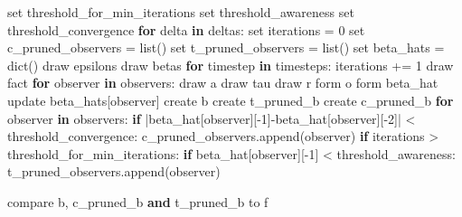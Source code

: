 \documentclass[11pt]{article}
\newenvironment{Shaded}{}{}
\newcommand{\KeywordTok}[1]{\textcolor[rgb]{0.00,0.44,0.13}{\textbf{{#1}}}}
\newcommand{\DecValTok}[1]{\textcolor[rgb]{0.25,0.63,0.44}{{#1}}}
\newcommand{\NormalTok}[1]{{#1}}
\newcommand{\ControlFlowTok}[1]{\textcolor[rgb]{0.00,0.44,0.13}{\textbf{{#1}}}}
\newcommand{\OperatorTok}[1]{\textcolor[rgb]{0.40,0.40,0.40}{{#1}}}
\newcommand{\BuiltInTok}[1]{{#1}}
\begin{document}
\begin{Shaded}
\begin{Highlighting}[]
\BuiltInTok{set}\NormalTok{ threshold\_for\_min\_iterations}
\BuiltInTok{set}\NormalTok{ threshold\_awareness}
\BuiltInTok{set}\NormalTok{ threshold\_convergence}
\ControlFlowTok{for}\NormalTok{ delta }\KeywordTok{in}\NormalTok{ deltas:}
    \BuiltInTok{set}\NormalTok{ iterations }\OperatorTok{=} \DecValTok{0}
    \BuiltInTok{set}\NormalTok{ c\_pruned\_observers }\OperatorTok{=} \BuiltInTok{list}\NormalTok{()}
    \BuiltInTok{set}\NormalTok{ t\_pruned\_observers }\OperatorTok{=} \BuiltInTok{list}\NormalTok{()}
    \BuiltInTok{set}\NormalTok{ beta\_hats }\OperatorTok{=} \BuiltInTok{dict}\NormalTok{()}
\NormalTok{    draw epsilons}
\NormalTok{    draw betas}
    \ControlFlowTok{for}\NormalTok{ timestep }\KeywordTok{in}\NormalTok{ timesteps:}
\NormalTok{        iterations }\OperatorTok{+=} \DecValTok{1}
\NormalTok{        draw fact}
        \ControlFlowTok{for}\NormalTok{ observer }\KeywordTok{in}\NormalTok{ observers:}
\NormalTok{            draw a}
\NormalTok{            draw tau}
\NormalTok{            draw r}
\NormalTok{            form o}
\NormalTok{            form beta\_hat}
\NormalTok{            update beta\_hats[observer]}
\NormalTok{        create b}
\NormalTok{        create t\_pruned\_b}
\NormalTok{        create c\_pruned\_b}
        \ControlFlowTok{for}\NormalTok{ observer }\KeywordTok{in}\NormalTok{ observers:}
            \ControlFlowTok{if} \OperatorTok{|}\NormalTok{beta\_hat[observer][}\OperatorTok{{-}}\DecValTok{1}\NormalTok{]}\OperatorTok{{-}}\NormalTok{beta\_hat[observer][}\OperatorTok{{-}}\DecValTok{2}\NormalTok{]}\OperatorTok{|} \OperatorTok{\textless{}}\NormalTok{ threshold\_convergence:}
\NormalTok{                c\_pruned\_observers.append(observer)}
            \ControlFlowTok{if}\NormalTok{ iterations }\OperatorTok{\textgreater{}}\NormalTok{ threshold\_for\_min\_iterations:}
                \ControlFlowTok{if}\NormalTok{ beta\_hat[observer][}\OperatorTok{{-}}\DecValTok{1}\NormalTok{] }\OperatorTok{\textless{}}\NormalTok{ threshold\_awareness:}
\NormalTok{                    t\_pruned\_observers.append(observer)}
        
\NormalTok{        compare b, c\_pruned\_b }\KeywordTok{and}\NormalTok{ t\_pruned\_b to f}
\end{Highlighting}
\end{Shaded}


    
    
    
\end{document}
